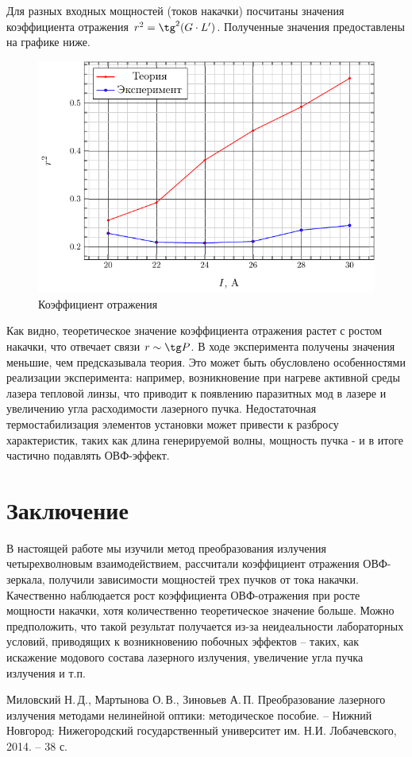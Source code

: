 \documentclass[a4paper,14pt]{extarticle}
\begin{document}
Для разных входных мощностей (токов накачки) посчитаны значения коэффициента отражения $r^2 = \tg^2(G\cdot L')$. Полученные значения  предоставлены на графике ниже.
\begin{figure}[H]
	\centering
	\includegraphics[scale=1.33]{fig/r}
	\caption{Коэффициент отражения}
	\label{fig:2} 
\end{figure}

Как видно, теоретическое значение коэффициента отражения растет с ростом накачки, что отвечает связи $r \sim \tg P$.  В ходе эксперимента получены значения меньшие, чем предсказывала теория. Это может быть обусловлено особенностями реализации эксперимента: например, возникновение при нагреве активной среды лазера тепловой линзы, что приводит к появлению паразитных мод в лазере и увеличению угла расходимости лазерного пучка. Недостаточная термостабилизация элементов установки может привести к разбросу характеристик, таких как длина генерируемой волны, мощность пучка - и в итоге частично подавлять ОВФ-эффект.

{}
\section*{Заключение}
В настоящей работе мы изучили метод преобразования излучения четырехволновым взаимодействием, рассчитали коэффициент отражения ОВФ-зеркала, получили зависимости мощностей трех пучков от тока накачки. Качественно наблюдается рост коэффициента ОВФ-отражения при росте мощности накачки, хотя количественно теоретическое значение больше. Можно предположить, что такой результат получается из-за  неидеальности лабораторных условий, приводящих к возникновению побочных эффектов -- таких, как искажение модового состава лазерного излучения, увеличение угла пучка излучения и т.п. 

\begin{thebibliography}{}
   Миловский Н.\,Д., Мартынова О.\,В., Зиновьев А.\,П. Преобразование лазерного излучения методами нелинейной оптики: методическое пособие. -- Нижний Новгород: Нижегородский государственный университет им. Н.И. Лобачевского, 2014. -- 38 с.
    
\end{thebibliography}
\end{document}
